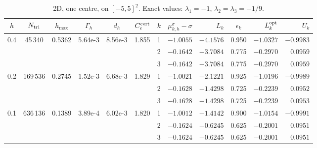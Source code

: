 
\begin{table}[htbp]
\caption{2D, one centre, on $[-5,5]^2$. Exact values: $\lambda_1=-1$, $\lambda_2=\lambda_3=-1/9$.}
\label{tab:coulomb-2d-cecr}
\centering\footnotesize
\setlength{\tabcolsep}{2.5pt}
\begin{tabular}{cccccc|crrcrr}
\toprule
$h$ & $N_{\rm tri}$ & $h_{\max}$ & $\Gamma_h$ & $d_h$ & $C_\epsilon^{\rm cert}$ & $k$ & $\mu_{k,h}^\sigma{-}\sigma$ & $L_k$ & $\epsilon_k$ & $L_k^{\rm opt}$ & $U_k$ \\
\midrule
\multirow{3}{*}{0.4} & \multirow{3}{*}{45\,340} & \multirow{3}{*}{0.5362} & \multirow{3}{*}{5.64e-3} & \multirow{3}{*}{8.56e-3} & \multirow{3}{*}{1.855} & 1 & $-1.0055$ & $-4.1576$ & 0.950 & $-1.0327$ & $-0.9983$ \\
 & & & & & & 2 & $-0.1642$ & $-3.7084$ & 0.775 & $-0.2970$ & $0.0959$ \\
 & & & & & & 3 & $-0.1642$ & $-3.7084$ & 0.775 & $-0.2970$ & $0.0959$ \\
\midrule
\multirow{3}{*}{0.2} & \multirow{3}{*}{169\,536} & \multirow{3}{*}{0.2745} & \multirow{3}{*}{1.52e-3} & \multirow{3}{*}{6.68e-3} & \multirow{3}{*}{1.829} & 1 & $-1.0021$ & $-2.1221$ & 0.925 & $-1.0196$ & $-0.9989$ \\
 & & & & & & 2 & $-0.1628$ & $-1.4298$ & 0.725 & $-0.2239$ & $0.0952$ \\
 & & & & & & 3 & $-0.1628$ & $-1.4298$ & 0.725 & $-0.2239$ & $0.0953$ \\
\midrule
\multirow{3}{*}{0.1} & \multirow{3}{*}{636\,136} & \multirow{3}{*}{0.1389} & \multirow{3}{*}{3.89e-4} & \multirow{3}{*}{6.02e-3} & \multirow{3}{*}{1.820} & 1 & $-1.0012$ & $-1.4142$ & 0.900 & $-1.0154$ & $-0.9991$ \\
 & & & & & & 2 & $-0.1624$ & $-0.6245$ & 0.625 & $-0.2001$ & $0.0951$ \\
 & & & & & & 3 & $-0.1624$ & $-0.6245$ & 0.625 & $-0.2001$ & $0.0951$ \\
\bottomrule
\end{tabular}
\end{table}

